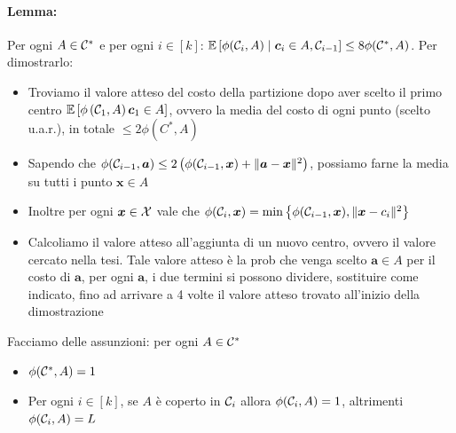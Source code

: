 \paragraph{Lemma:} Per ogni $A \in \mathcal{C}^\ast$ e per ogni $i \in [k]$: $\mathbb{E} \left[\phi (\mathcal{C}_i, A) \mid \bm c_i \in A, \mathcal{C}_{i-1} \right] \leq 8 \phi (\mathcal{C}^\ast, A)$. Per dimostrarlo:
\begin{itemize}
	\item Troviamo il valore atteso del costo della partizione dopo aver scelto il primo centro $\mathbb{E} \left[\phi \left(\mathcal{C}_1, A\right) \bm c_1 \in A\right]$, ovvero la media del costo di ogni punto (scelto u.a.r.), in totale $\leq 2 \phi (C^\ast, A)$
	
	\item Sapendo che $\phi (\mathcal{C}_{i-1}, \bm a) \leq 2 \left(\phi (\mathcal{C}_{i-1}, \bm x) + \| \bm a - \bm x \|^2 \right) $, possiamo farne la media su tutti i punto $\bm x \in A$
	
	\item Inoltre per ogni $\bm x \in \mathcal{X}$ vale che $\phi (\mathcal{C}_i, \bm x) = \min \left\{\phi (\mathcal{C}_{i-1}, \bm x), \|\bm x - c_i\|^2 \right\}$
	
	\item Calcoliamo il valore atteso all'aggiunta di un nuovo centro, ovvero il valore cercato nella tesi. Tale valore atteso è la prob che venga scelto $\bm a \in A$ per il costo di $\bm a$, per ogni $\bm a$, i due termini si possono dividere, sostituire come indicato, fino ad arrivare a 4 volte il valore atteso trovato all'inizio della dimostrazione
\end{itemize}

Facciamo delle assunzioni: per ogni $A \in \mathcal{C}^\ast$
\begin{itemize}
	\item $\phi(\mathcal{C}^\ast, A) = 1$
	
	\item Per ogni $i \in [k]$, se $A$ è coperto in $\mathcal{C}_i$ allora $\phi(\mathcal{C}_i, A) = 1$, altrimenti $\phi(\mathcal{C}_i, A) = L$
\end{itemize}

